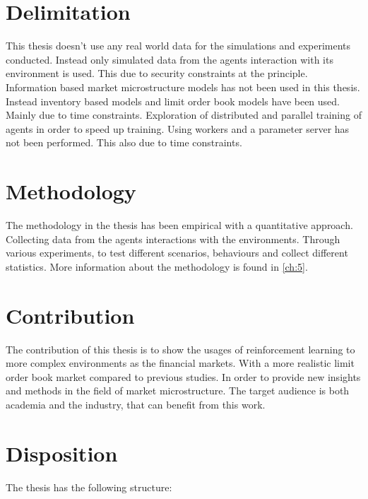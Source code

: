 \documentclass{kththesis}
\theoremstyle{definition}
\begin{document}
\section{Delimitation}
This thesis doesn't use any real world data for the simulations and experiments conducted. Instead only simulated data from the agents interaction with its environment is used. This due to security constraints at the principle. Information based market microstructure models has not been used in this thesis. Instead inventory based models and limit order book models have been used. Mainly due to time constraints. Exploration of distributed and parallel training of agents in order to speed up training. Using workers and a parameter server has not been performed. This also due to time constraints.

\section{Methodology}
The methodology in the thesis has been empirical with a quantitative approach. Collecting data from the agents interactions with the environments. Through various experiments, to test different scenarios, behaviours and collect different statistics. More information about the methodology is found in \autoref{ch:5}.


\section{Contribution}
The contribution of this thesis is to show the usages of reinforcement learning to more complex environments as the financial markets. With a more realistic limit order book market compared to previous studies. In order to provide new insights and methods in the field of market microstructure. The target audience is both academia and the industry, that can benefit from this work.

\newpage
\section{Disposition}
The thesis has the following structure:
\end{document}
